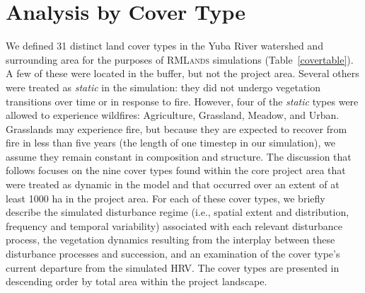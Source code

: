 \clearpage

\chapter{Analysis by Cover Type}
\label{ch:covtype}
We defined 31 distinct land cover types in the Yuba River watershed and surrounding area for the purposes of \textsc{RMLands} simulations (Table~\ref{covertable}). A few of these were located in the buffer, but not the project area. Several others were treated as \emph{static} in the simulation: they did not undergo vegetation transitions over time or in response to fire. However, four of the \emph{static} types were allowed to experience wildfires: Agriculture, Grassland, Meadow, and Urban. Grasslands may experience fire, but because they are expected to recover from fire in less than five years (the length of one timestep in our simulation), we assume they remain constant in composition and structure. The discussion that follows focuses on the nine cover types found within the core project area that were treated as dynamic in the model and that occurred over an extent of at least 1000 ha in the project area. For each of these cover types, we briefly describe the simulated disturbance regime (i.e., spatial extent and distribution, frequency and temporal variability) associated with each relevant disturbance process, the vegetation dynamics resulting from the interplay between these disturbance processes and succession, and an examination of the cover type’s current departure from the simulated HRV. The cover types are presented in descending order by total area within the project landscape.








